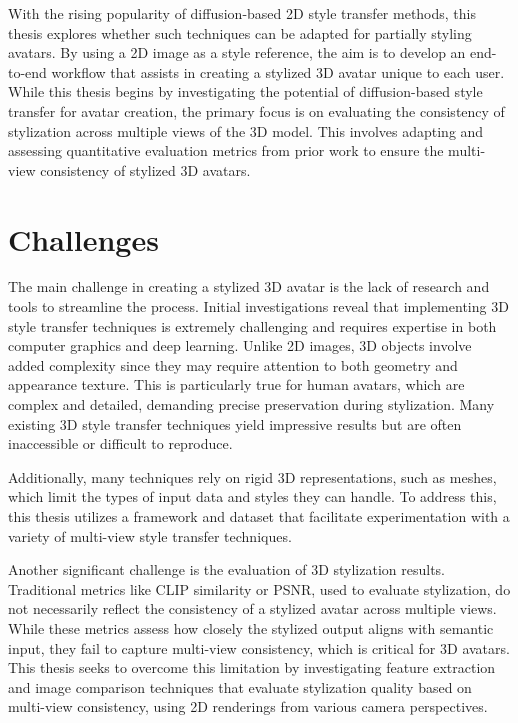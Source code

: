 With the rising popularity of diffusion-based 2D style transfer methods, this thesis explores whether such techniques can be adapted for partially styling avatars. By using a 2D image as a style reference, the aim is to develop an end-to-end workflow that assists in creating a stylized 3D avatar unique to each user. While this thesis begins by investigating the potential of diffusion-based style transfer for avatar creation, the primary focus is on evaluating the consistency of stylization across multiple views of the 3D model. This involves adapting and assessing quantitative evaluation metrics from prior work to ensure the multi-view consistency of stylized 3D avatars.

\section{Challenges}
The main challenge in creating a stylized 3D avatar is the lack of research and tools to streamline the process. Initial investigations reveal that implementing 3D style transfer techniques is extremely challenging and requires expertise in both computer graphics and deep learning. Unlike 2D images, 3D objects involve added complexity since they may require attention to both geometry and appearance texture. This is particularly true for human avatars, which are complex and detailed, demanding precise preservation during stylization. Many existing 3D style transfer techniques yield impressive results but are often inaccessible or difficult to reproduce.

Additionally, many techniques rely on rigid 3D representations, such as meshes, which limit the types of input data and styles they can handle. To address this, this thesis utilizes a framework and dataset that facilitate experimentation with a variety of multi-view style transfer techniques.

Another significant challenge is the evaluation of 3D stylization results. Traditional metrics like CLIP similarity or PSNR, used to evaluate stylization, do not necessarily reflect the consistency of a stylized avatar across multiple views. While these metrics assess how closely the stylized output aligns with semantic input, they fail to capture multi-view consistency, which is critical for 3D avatars. This thesis seeks to overcome this limitation by investigating feature extraction and image comparison techniques that evaluate stylization quality based on multi-view consistency, using 2D renderings from various camera perspectives.